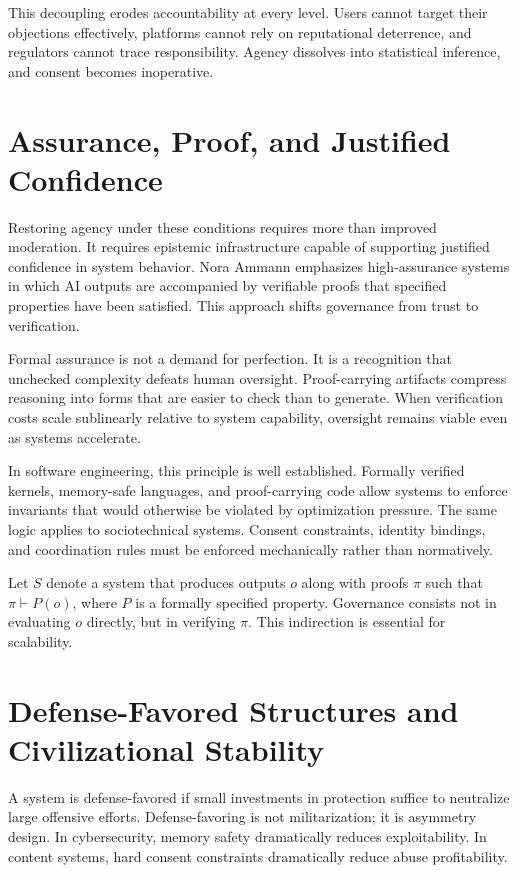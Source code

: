 \documentclass[11pt,oneside]{article}
\begin{document}
This decoupling erodes accountability at every level. Users cannot target their objections effectively, platforms cannot rely on reputational deterrence, and regulators cannot trace responsibility. Agency dissolves into statistical inference, and consent becomes inoperative.

\section{Assurance, Proof, and Justified Confidence}

Restoring agency under these conditions requires more than improved moderation. It requires epistemic infrastructure capable of supporting justified confidence in system behavior. Nora Ammann emphasizes high-assurance systems in which AI outputs are accompanied by verifiable proofs that specified properties have been satisfied. This approach shifts governance from trust to verification.

Formal assurance is not a demand for perfection. It is a recognition that unchecked complexity defeats human oversight. Proof-carrying artifacts compress reasoning into forms that are easier to check than to generate. When verification costs scale sublinearly relative to system capability, oversight remains viable even as systems accelerate.

In software engineering, this principle is well established. Formally verified kernels, memory-safe languages, and proof-carrying code allow systems to enforce invariants that would otherwise be violated by optimization pressure. The same logic applies to sociotechnical systems. Consent constraints, identity bindings, and coordination rules must be enforced mechanically rather than normatively.

Let \( S \) denote a system that produces outputs \( o \) along with proofs \( \pi \) such that \( \pi \vdash P(o) \), where \( P \) is a formally specified property. Governance consists not in evaluating \( o \) directly, but in verifying \( \pi \). This indirection is essential for scalability.

\section{Defense-Favored Structures and Civilizational Stability}

A system is defense-favored if small investments in protection suffice to neutralize large offensive efforts. Defense-favoring is not militarization; it is asymmetry design. In cybersecurity, memory safety dramatically reduces exploitability. In content systems, hard consent constraints dramatically reduce abuse profitability.
\end{document}
